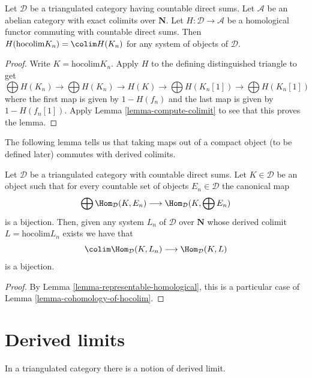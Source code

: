 \begin{lemma}
\label{lemma-cohomology-of-hocolim}
Let $\mathcal{D}$ be a triangulated category having countable
direct sums. Let $\mathcal{A}$ be an abelian category with exact
colimits over $\mathbf{N}$.
Let $H : \mathcal{D} \to \mathcal{A}$ be a homological functor
commuting with countable direct sums.
Then $H(\text{hocolim} K_n) = \colim H(K_n)$
for any system of objects of $\mathcal{D}$.
\end{lemma}

\begin{proof}
Write $K = \text{hocolim} K_n$. Apply $H$ to the defining
distinguished triangle to get
$$
\bigoplus H(K_n) \to \bigoplus H(K_n)
\to H(K) \to
\bigoplus H(K_n[1]) \to \bigoplus H(K_n[1])
$$
where the first map is given by $1 - H(f_n)$ and the last map
is given by $1 - H(f_n[1])$.
Apply Lemma \ref{lemma-compute-colimit} to see that this proves the lemma.
\end{proof}

\noindent
The following lemma tells us that taking maps out of a compact
object (to be defined later) commutes with derived colimits.

\begin{lemma}
\label{lemma-commutes-with-countable-sums}
Let $\mathcal{D}$ be a triangulated category with countable direct sums.
Let $K \in \mathcal{D}$ be an object such that for every
countable set of objects $E_n \in \mathcal{D}$ the canonical map
$$
\bigoplus \Hom_\mathcal{D}(K, E_n)
\longrightarrow
\Hom_\mathcal{D}(K, \bigoplus E_n)
$$
is a bijection. Then, given any system $L_n$ of $\mathcal{D}$ over
$\mathbf{N}$ whose derived colimit $L = \text{hocolim} L_n$
exists we have that
$$
\colim \Hom_\mathcal{D}(K, L_n) \longrightarrow \Hom_\mathcal{D}(K, L)
$$
is a bijection.
\end{lemma}

\begin{proof}
By Lemma \ref{lemma-representable-homological}, this is a particular case
of Lemma \ref{lemma-cohomology-of-hocolim}.
\end{proof}







\section{Derived limits}
\label{section-derived-limit}

\noindent
In a triangulated category there is a notion of derived limit.

